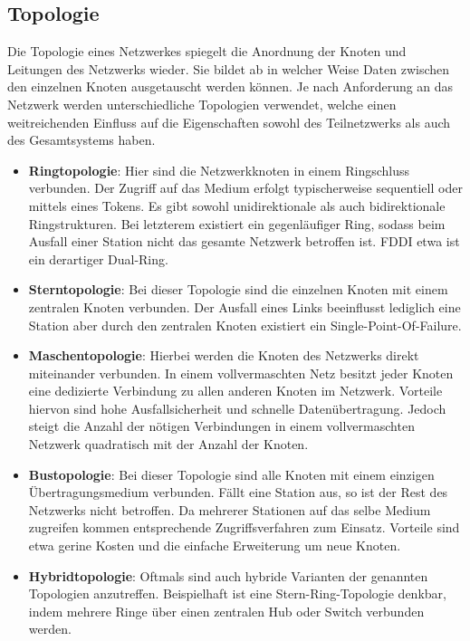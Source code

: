     \subsection{Topologie}
    Die Topologie eines Netzwerkes spiegelt die Anordnung der Knoten und Leitungen des Netzwerks wieder. Sie bildet ab in welcher Weise Daten zwischen
    den einzelnen Knoten ausgetauscht werden können. Je nach Anforderung an das Netzwerk werden unterschiedliche Topologien verwendet,
    welche einen weitreichenden Einfluss auf die Eigenschaften sowohl des Teilnetzwerks als auch des Gesamtsystems haben.
        \begin{itemize}
            \item \textbf{Ringtopologie}: Hier sind die Netzwerkknoten in einem Ringschluss verbunden. Der Zugriff auf das Medium erfolgt typischerweise sequentiell 
            oder mittels eines Tokens. Es gibt sowohl unidirektionale als auch bidirektionale Ringstrukturen. Bei letzterem existiert ein gegenläufiger Ring, 
            sodass beim Ausfall einer Station nicht das gesamte Netzwerk betroffen ist. FDDI etwa ist ein derartiger Dual-Ring.
            \item \textbf{Sterntopologie}: Bei dieser Topologie sind die einzelnen Knoten mit einem zentralen Knoten verbunden. Der Ausfall eines Links beeinflusst lediglich
            eine Station aber durch den zentralen Knoten existiert ein Single-Point-Of-Failure. 
            \item \textbf{Maschentopologie}: Hierbei werden die Knoten des Netzwerks direkt miteinander verbunden. In einem vollvermaschten Netz besitzt jeder Knoten eine 
            dedizierte Verbindung zu allen anderen Knoten im Netzwerk. Vorteile hiervon sind hohe Ausfallsicherheit und schnelle Datenübertragung. Jedoch steigt die Anzahl der 
            nötigen Verbindungen in einem vollvermaschten Netzwerk quadratisch mit der Anzahl der Knoten.
            \item \textbf{Bustopologie}: Bei dieser Topologie sind alle Knoten mit einem einzigen Übertragungsmedium verbunden. Fällt eine Station aus, so ist der Rest des Netzwerks
            nicht betroffen. Da mehrerer Stationen auf das selbe Medium zugreifen kommen entsprechende Zugriffsverfahren zum Einsatz. Vorteile sind etwa gerine Kosten und die
            einfache Erweiterung um neue Knoten.
            \item \textbf{Hybridtopologie}: Oftmals sind auch hybride Varianten der genannten Topologien anzutreffen. Beispielhaft ist eine Stern-Ring-Topologie denkbar, indem
            mehrere Ringe über einen zentralen Hub oder Switch verbunden werden.
        \end{itemize}

